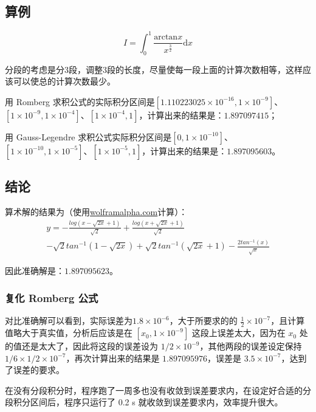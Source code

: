 \subsection{算例}

\begin{equation}
    I = \int_0^1 \frac{\mathrm{arctan}x}{x^{\frac{3}{2}}} \mathrm{d}x
\end{equation}

分段的考虑是分3段，调整3段的长度，尽量使每一段上面的计算次数相等，这样应该可以使总的计算次数最少。

用 Romberg 求积公式的实际积分区间是$[1.110223025\times 10^{-16},1\times 10^{-9}]$、$[1\times 10^{-9},1\times 10^{-4}]$、$[1\times 10^{-4},1]$，计算出来的结果是：$1.897097415$；

用 Gauss-Legendre 求积公式实际积分区间是$[0,1\times 10^{-10}]$、$[1\times 10^{-10},1\times 10^{-5}]$、$[1\times 10^{-5},1]$，计算出来的结果是：$1.897095603$。

\subsection{结论}

算术解的结果为（使用\href{https://www.wolframalpha.com/}{wolframalpha.com}计算）：
\begin{multline}
    y = -\frac{log(x - \sqrt{2x} + 1)}{\sqrt{2}} + \frac{log(x + \sqrt{2x} + 1)}{\sqrt{2}} {} \\
    - \sqrt{2} tan^{-1}(1 - \sqrt{2x}) + \sqrt{2} tan^{-1}(\sqrt{2x} + 1) - \frac{2 tan^{-1}(x)}{\sqrt{x}}
\end{multline}

因此准确解是：$1.897095623$。

\subsubsection{复化 Romberg 公式}

对比准确解可以看到，实际误差为$1.8\times 10^{-6}$，大于所要求的的 $\frac{1}{2}\times 10^{-7}$，且计算值略大于真实值，分析后应该是在 $[x_0,1\times 10^{-9}]$ 这段上误差太大，因为在 $x_0$ 处的值还是太大了，因此将这段的误差设为 $1/2\times 10^{-9}$，其他两段的误差设定保持 $1/6 \times 1/2 \times 10^{-7}$，再次计算出来的结果是 $1.897095976$，误差是 $3.5\times 10^{-7}$，达到了误差的要求。

在没有分段积分时，程序跑了一周多也没有收敛到误差要求内，在设定好合适的分段积分区间后，程序只运行了 0.2 s 就收敛到误差要求内，效率提升很大。

